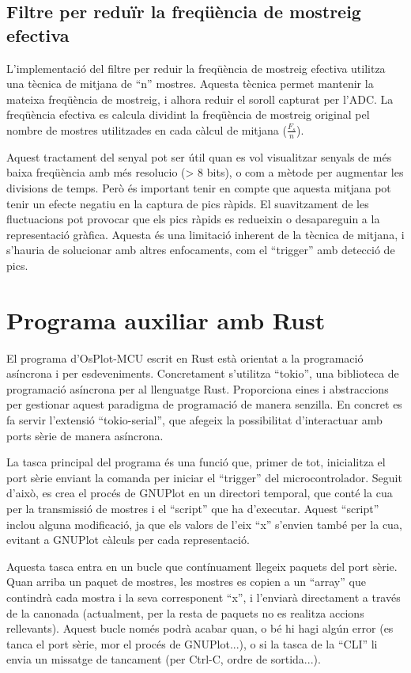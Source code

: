 \documentclass{tfgitic}[2023/06/30]
\begin{document}
\subsection{Filtre per reduïr la freqüència de mostreig efectiva}

L'implementació del filtre per reduir la freqüència de mostreig
efectiva utilitza una tècnica de mitjana de ``n'' mostres. Aquesta
tècnica permet mantenir la mateixa freqüència de mostreig, i alhora
reduir el soroll capturat per l'ADC. La freqüència efectiva es calcula
dividint la freqüència de mostreig original pel nombre de mostres
utilitzades en cada càlcul de mitjana ($\frac{F_{s}}{n}$).

Aquest tractament del senyal pot ser útil quan es vol visualitzar
senyals de més baixa freqüència amb més resolucio (> 8 bits), o com a
mètode per augmentar les divisions de temps. Però és important tenir
en compte que aquesta mitjana pot tenir un efecte negatiu en la
captura de pics ràpids. El suavitzament de les fluctuacions pot
provocar que els pics ràpids es redueixin o desapareguin a la
representació gràfica. Aquesta és una limitació inherent de la tècnica
de mitjana, i s'hauria de solucionar amb altres enfocaments, com el
``trigger'' amb detecció de pics.

\section{Programa auxiliar amb Rust}

El programa d'OsPlot-MCU escrit en Rust està orientat a la programació
asíncrona i per esdeveniments. Concretament s'utilitza ``tokio'', una
biblioteca de programació asíncrona per al llenguatge
Rust. Proporciona eines i abstraccions per gestionar aquest paradigma
de programació de manera senzilla. En concret es fa servir l'extensió
``tokio-serial'', que afegeix la possibilitat d'interactuar amb ports
sèrie de manera asíncrona.

\newpage

La tasca principal del programa és una funció que, primer de tot,
inicialitza el port sèrie enviant la comanda per iniciar el
``trigger'' del microcontrolador. Seguit d'això, es crea el procés de
GNUPlot en un directori temporal, que conté la cua per la transmissió
de mostres i el ``script'' que ha d'executar.  Aquest ``script''
inclou alguna modificació, ja que els valors de l'eix ``x'' s'envien
també per la cua, evitant a GNUPlot càlculs per cada representació.

Aquesta tasca entra en un bucle que contínuament llegeix paquets del
port sèrie. Quan arriba un paquet de mostres, les mostres es copien a
un ``array'' que contindrà cada mostra i la seva corresponent ``x'', i
l'enviarà directament a través de la canonada (actualment, per la
resta de paquets no es realitza accions rellevants). Aquest bucle
només podrà acabar quan, o bé hi hagi algún error (es tanca el port
sèrie, mor el procés de GNUPlot...), o si la tasca de la ``CLI'' li
envia un missatge de tancament (per Ctrl-C, ordre de sortida...).
\end{document}
